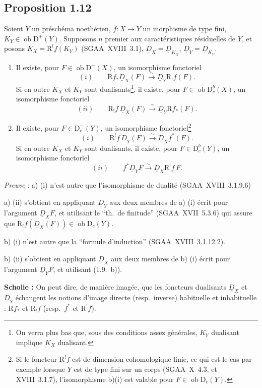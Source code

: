 \documentclass[11pt]{article}
\newcommand{\R}{\mathrm{R}}\newcommand{\RHomCore}{\mathrm{RHom}}
\newcommand{\D}{\mathrm{D}}
\newcommand{\ob}{\operatorname{ob}}
\providecommand{\ob}{\operatorname{ob}}
\providecommand{\R}{\mathrm R}
\begin{document}
\subsection*{Proposition 1.12}
Soient $Y$ un préschéma noethérien, $f : X \to Y$ un morphisme de type fini, $K_Y \in \ob \D^{+}(Y)$. Supposons $n$ premier aux caractéristiques résiduelles de $Y$, et posons $K_X = \R^{!}f(K_Y)$ (SGAA~XVIII~3.1), $\underline{D}_X = \underline{D}_{K_X}$, $\underline{D}_Y = \underline{D}_{K_Y}$.
\begin{enumerate}
\item[a)] Il existe, pour $F \in \ob \D^{-}(X)$, un isomorphisme fonctoriel
\[
(i) \qquad \R f_{*} \underline{D}_X(F) \xrightarrow{\sim} \underline{D}_Y \R_{!}f(F).
\]
Si en
outre $K_X$ et $K_Y$ sont dualisants\footnote{On verra plus bas que, sous des conditions assez générales, $K_Y$ dualisant implique $K_X$ dualisant.}, il existe, pour $F \in \ob \D_c^{b}(X)$, un isomorphisme fonctoriel
\[
(ii) \qquad \R_{!}f \, \underline{D}_X(F) \xrightarrow{\sim} \underline{D}_Y \R f_{*}(F).
\]
\item[b)] Il existe, pour $F \in \D_c^{-}(Y)$, un isomorphisme fonctoriel\footnote{Si le foncteur $\R^{!}f$ est de dimension cohomologique finie, ce qui est le cas par exemple lorsque $Y$ est de type fini sur un corps (SGAA~X~4.3. et XVIII~3.1.7), l'isomorphisme b)(i) est valable pour $F \in \ob \D_c(Y)$.}
\[
(i) \qquad \R^{!}f \, \underline{D}_Y(F) \xrightarrow{\sim} \underline{D}_X f^{*}(F).
\]
Si en outre $K_X$ et $K_Y$ sont dualisants\footnotemark[3], il existe, pour $F \in \D_c^{b}(Y)$, un isomorphisme fonctoriel
\[
(ii) \qquad f^{*} \underline{D}_Y F \xrightarrow{\sim} \underline{D}_X \R^{!}f \, F.
\]
\end{enumerate}

\emph{Preuve} : a) (i) n'est autre que l'isomorphisme de dualité (SGAA~XVIII~3.1.9.6)

a) (ii) s'obtient en appliquant $\underline{D}_Y$ aux deux membres de a) (i) écrit pour l'argument $\underline{D}_X F$, et utilisant le ``th.~de finitude'' (SGAA~XVII~5.3.6) qui assure que $\R_{!}f(\underline{D}_X(F)) \in \ob \D_c(Y)$.

b) (i) n'est autre que la ``formule d'induction'' (SGAA~XVIII~3.1.12.2).

b) (ii) s'obtient en appliquant $\underline{D}_X$ aux deux membres de b) (i) écrit pour l'argument $\underline{D}_Y F$, et utilisant (1.9.~b)).

\textbf{Scholie :} On peut dire, de manière imagée, que les foncteurs dualisants 
$\underline{D}_X$ et $\underline{D}_Y$
échangent les notions d'image directe (resp.~inverse) habituelle et inhabituelle : $\R f_{*}$ et $\R_{!}f$ (resp.~$f^{*}$ et $\R^{!}f$).
\end{document}
